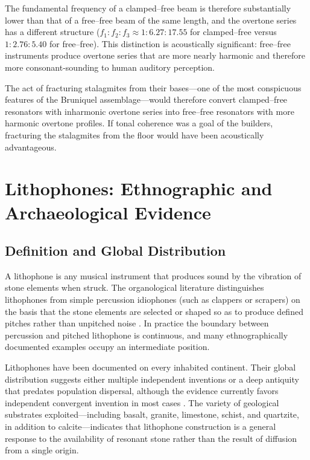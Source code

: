 \documentclass[12pt]{article}
\begin{document}
The fundamental frequency of a clamped--free beam is therefore substantially lower than that of a free--free beam of the same length, and the overtone series has a different structure ($f_1 : f_2 : f_3 \approx 1 : 6.27 : 17.55$ for clamped--free versus $1 : 2.76 : 5.40$ for free--free). This distinction is acoustically significant: free--free instruments produce overtone series that are more nearly harmonic and therefore more consonant-sounding to human auditory perception.

The act of fracturing stalagmites from their bases—one of the most conspicuous features of the Bruniquel assemblage—would therefore convert clamped--free resonators with inharmonic overtone series into free--free resonators with more harmonic overtone profiles. If tonal coherence was a goal of the builders, fracturing the stalagmites from the floor would have been acoustically advantageous.

\section{Lithophones: Ethnographic and Archaeological Evidence}

\subsection{Definition and Global Distribution}

A lithophone is any musical instrument that produces sound by the vibration of stone elements when struck. The organological literature distinguishes lithophones from simple percussion idiophones (such as clappers or scrapers) on the basis that the stone elements are selected or shaped so as to produce defined pitches rather than unpitched noise \citep{Hornbostel1914, Collaer1960}. In practice the boundary between percussion and pitched lithophone is continuous, and many ethnographically documented examples occupy an intermediate position.

Lithophones have been documented on every inhabited continent. Their global distribution suggests either multiple independent inventions or a deep antiquity that predates population dispersal, although the evidence currently favors independent convergent invention in most cases \citep{Conard2009}. The variety of geological substrates exploited—including basalt, granite, limestone, schist, and quartzite, in addition to calcite—indicates that lithophone construction is a general response to the availability of resonant stone rather than the result of diffusion from a single origin.
\end{document}
